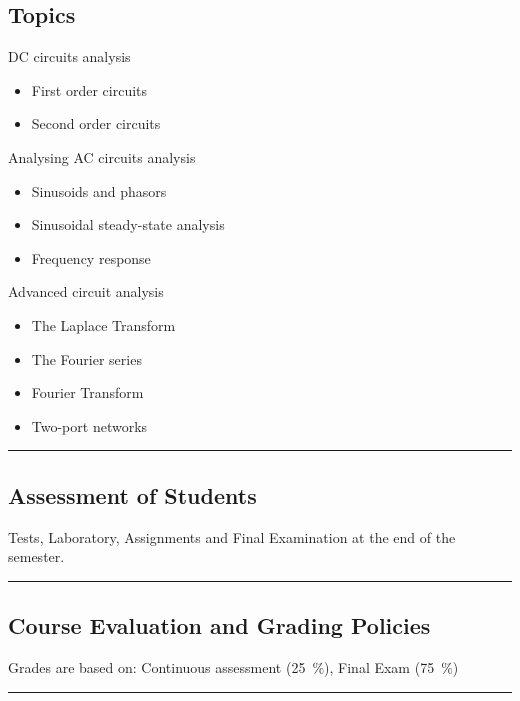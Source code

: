 \subsection*{Topics}
\begin{outline}
    \1 DC circuits analysis
    \begin{itemize}
        \item First order circuits
        \item Second order circuits
    \end{itemize}
    \1 Analysing AC circuits analysis
    \begin{itemize}
        \item Sinusoids and phasors
        \item Sinusoidal steady-state analysis
        \item Frequency response
    \end{itemize}
    \1 Advanced circuit analysis
    \begin{itemize}
        \item The Laplace Transform
        \item The Fourier series
        \item Fourier Transform
        \item Two-port networks
    \end{itemize}
\end{outline}
\vspace{2ex} \hrule\vspace{2ex}

\subsection*{Assessment of Students}
Tests, Laboratory, Assignments and Final Examination at the end of the semester.
\vspace{2ex}\hrule\vspace{2ex}

\subsection*{Course Evaluation and Grading Policies}
Grades are based on:
Continuous assessment (\qty{25}{\percent}),
Final Exam (\qty{75}{\percent})
\vspace{2ex}\hrule\vspace{2ex}

